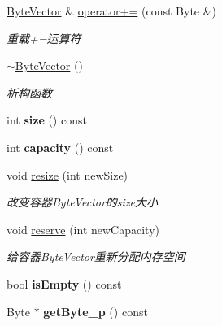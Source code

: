 \begin{DoxyCompactItemize}
\mbox{\label{class_byte_vector_a25ec937327da7acfa5c061bb6535a79f}} 
\mbox{\hyperlink{class_byte_vector}{Byte\+Vector}} \& \mbox{\hyperlink{class_byte_vector_a25ec937327da7acfa5c061bb6535a79f}{operator+=}} (const Byte \&)
\begin{DoxyCompactList}\small\item\em 重载+=运算符 \end{DoxyCompactList}\item 
\mbox{\label{class_byte_vector_acb961af09bfb53efe8b89a1b91e50aba}} 
\mbox{\hyperlink{class_byte_vector_acb961af09bfb53efe8b89a1b91e50aba}{$\sim$\+Byte\+Vector}} ()
\begin{DoxyCompactList}\small\item\em 析构函数 \end{DoxyCompactList}\item 
\mbox{\label{class_byte_vector_a4737a95ed03ce6c9dac4aed27b02d3b0}} 
int {\bfseries size} () const
\item 
\mbox{\label{class_byte_vector_a5b84e37dae5afe2ef9044ba739b0b244}} 
int {\bfseries capacity} () const
\item 
\mbox{\label{class_byte_vector_a9c7e92a6b4489e2b2519e062e45b1ed1}} 
void \mbox{\hyperlink{class_byte_vector_a9c7e92a6b4489e2b2519e062e45b1ed1}{resize}} (int new\+Size)
\begin{DoxyCompactList}\small\item\em 改变容器\+Byte\+Vector的size大小 \end{DoxyCompactList}\item 
\mbox{\label{class_byte_vector_a23a0a135f12000a1fd86b9b73325f986}} 
void \mbox{\hyperlink{class_byte_vector_a23a0a135f12000a1fd86b9b73325f986}{reserve}} (int new\+Capacity)
\begin{DoxyCompactList}\small\item\em 给容器\+Byte\+Vector重新分配内存空间 \end{DoxyCompactList}\item 
\mbox{\label{class_byte_vector_a714e2a7dda6926b9350450b51faea6c5}} 
bool {\bfseries is\+Empty} () const
\item 
\mbox{\label{class_byte_vector_a5f8ee71427bd48aafeb3729965f3c756}} 
Byte $\ast$ {\bfseries get\+Byte\+\_\+p} () const
\end{DoxyCompactItemize}
